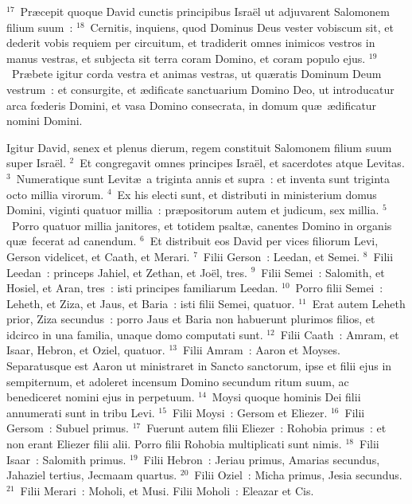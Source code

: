 ${}^{17}$~Pr\ae cepit quoque David cunctis principibus Isra\"el ut adjuvarent Salomonem filium suum~:
${}^{18}$~Cernitis, inquiens, quod Dominus Deus vester vobiscum sit, et dederit vobis requiem per circuitum, et tradiderit omnes inimicos vestros in manus vestras, et subjecta sit terra coram Domino, et coram populo ejus.
${}^{19}$~Pr\ae bete igitur corda vestra et animas vestras, ut qu\ae ratis Dominum Deum vestrum~: et consurgite, et \ae dificate sanctuarium Domino Deo, ut introducatur arca fœderis Domini, et vasa Domino consecrata, in domum qu\ae\ \ae dificatur nomini Domini.

\bchapter
\lettrine[lines=3,image=true,loversize=0.05,lraise=-0.03]{I}{}gitur David, senex et plenus dierum, regem constituit Salomonem filium suum super Isra\"el.
${}^{2}$~Et congregavit omnes principes Isra\"el, et sacerdotes atque Levitas.
${}^{3}$~Numeratique sunt Levit\ae\ a triginta annis et supra~: et inventa sunt triginta octo millia virorum.
${}^{4}$~Ex his electi sunt, et distributi in ministerium domus Domini, viginti quatuor millia~: pr\ae positorum autem et judicum, sex millia.
${}^{5}$~Porro quatuor millia janitores, et totidem psalt\ae , canentes Domino in organis qu\ae\ fecerat ad canendum.
${}^{6}$~Et distribuit eos David per vices filiorum Levi, Gerson videlicet, et Caath, et Merari.
${}^{7}$~Filii Gerson~: Leedan, et Semei.
${}^{8}$~Filii Leedan~: princeps Jahiel, et Zethan, et Jo\"el, tres.
${}^{9}$~Filii Semei~: Salomith, et Hosiel, et Aran, tres~: isti principes familiarum Leedan.
${}^{10}$~Porro filii Semei~: Leheth, et Ziza, et Jaus, et Baria~: isti filii Semei, quatuor.
${}^{11}$~Erat autem Leheth prior, Ziza secundus~: porro Jaus et Baria non habuerunt plurimos filios, et idcirco in una familia, unaque domo computati sunt.
${}^{12}$~Filii Caath~: Amram, et Isaar, Hebron, et Oziel, quatuor.
${}^{13}$~Filii Amram~: Aaron et Moyses. Separatusque est Aaron ut ministraret in Sancto sanctorum, ipse et filii ejus in sempiternum, et adoleret incensum Domino secundum ritum suum, ac benediceret nomini ejus in perpetuum.
${}^{14}$~Moysi quoque hominis Dei filii annumerati sunt in tribu Levi.
${}^{15}$~Filii Moysi~: Gersom et Eliezer.
${}^{16}$~Filii Gersom~: Subuel primus.
${}^{17}$~Fuerunt autem filii Eliezer~: Rohobia primus~: et non erant Eliezer filii alii. Porro filii Rohobia multiplicati sunt nimis.
${}^{18}$~Filii Isaar~: Salomith primus.
${}^{19}$~Filii Hebron~: Jeriau primus, Amarias secundus, Jahaziel tertius, Jecmaam quartus.
${}^{20}$~Filii Oziel~: Micha primus, Jesia secundus.
${}^{21}$~Filii Merari~: Moholi, et Musi. Filii Moholi~: Eleazar et Cis.

